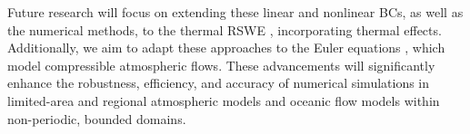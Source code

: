 \documentclass{article}
\numberwithin{equation}{section}
\theoremstyle{definition}
\begin{document}
Future research will focus on extending these linear and nonlinear BCs, as well as the numerical methods, to the thermal RSWE \cite{RICARDO2024112605, RicardoDuruLee2024}, incorporating thermal effects. Additionally, we aim to adapt these approaches to the Euler equations \cite{RicardoDuruLee2024, ricardo2024thermodynamicconsistencystructurepreservationsummation}, which model compressible atmospheric flows. These advancements will significantly enhance the robustness, efficiency, and accuracy of numerical simulations in limited-area and regional atmospheric models \cite{DaviesTerry2014, Baumhefner01011982, Caron2013, TermoniaDeckmynHamdi2009, williamson1992standard} and oceanic flow models \cite{zeitlin2018geophysical} within non-periodic, bounded domains.



\end{document}
